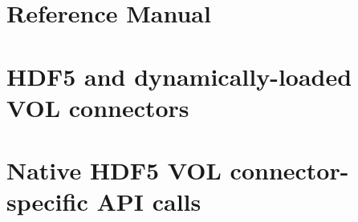 


\newpage



\newpage



\newpage



\newpage

\appendix

\section{Reference Manual}
\label{apdx:ref_manual}


\newpage

\section{HDF5 and dynamically-loaded VOL connectors}
\label{apdx:hdf5_dyn_vol_connectors}


\newpage

\section{Native HDF5 VOL connector-specific API calls}
\label{apdx:native_calls}

